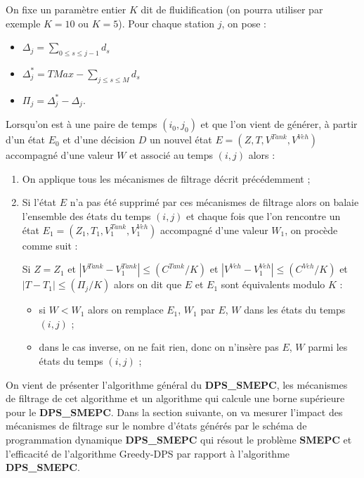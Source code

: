 On fixe un paramètre entier $K$ dit de fluidification (on pourra utiliser par exemple $K=10$ ou $K=5$). Pour chaque station $j$, on pose :
\begin{itemize}[label=$\square$]
\item $\Delta_j = \sum_{ 0 \leq s \leq j-1} d_s$
\item $\Delta^*_j = TMax - \sum_{ j \leq s \leq M}d_s$
\item $\Pi_j=\Delta^*_j-\Delta_j$.
\end{itemize}
Lorsqu'on est à une paire de temps $(i_0,j_0)$ et que l'on vient de générer, à partir d'un état $E_0$
 et d'une décision $D$ un nouvel état $E=(Z, T, V^{Tank}, V^{Veh})$ accompagné d'une valeur $W$ et associé au temps $(i,j)$ alors :
 \begin{enumerate}
 	\item On applique tous les mécanismes de filtrage décrit précédemment ;
 	\item Si l'état $E$ n'a pas été supprimé par ces mécanismes de filtrage alors on balaie l'ensemble des états du temps $(i,j)$ et chaque fois que l'on rencontre un état $E_1=(Z_1, T_1, V^{Tank}_1, V^{Veh}_1)$ accompagné d'une valeur $W_1$, on procède comme suit :
 	
 	Si $Z =Z_1$ et $|V^{Tank} - V^{Tank}_1| \leq (C^{Tank} / K)$ et $|V^{Veh} - V^{Veh}_1| \leq (C^{Veh} / K)$ et $|T - T_1| \leq (\Pi_j / K)$ alors on dit que $E$ et $E_1$ sont équivalents modulo $K$ :
 	\begin{itemize}[label=$\square$]
 		\item si $W<W_1$ alors on remplace $E_1$, $W_1$ par $E$, $W$ dans les états du temps $(i,j)$ ;
 		\item dans le cas inverse, on ne fait rien, donc on n'insère pas $E$, $W$ parmi les états du temps $(i,j)$ ;
 	\end{itemize}
 
 \end{enumerate}
 

On vient de présenter l'algorithme général du \textbf{DPS\_SMEPC}, les mécanismes de filtrage de cet algorithme et un algorithme qui calcule une borne supérieure pour le \textbf{DPS\_SMEPC}. Dans la section suivante, on va mesurer l'impact des mécanismes de filtrage sur le nombre d'états générés par le schéma de programmation dynamique \textbf{DPS\_SMEPC} qui résout le problème \textbf{SMEPC} et l'efficacité de l'algorithme Greedy-DPS par rapport à l'algorithme \textbf{DPS\_SMEPC}.


